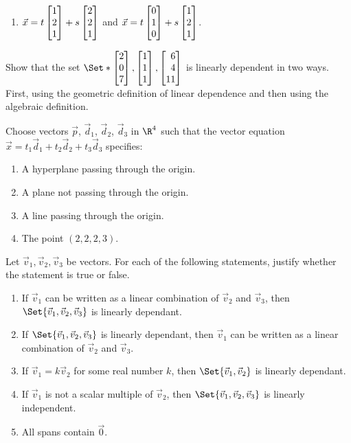\begin{exercises}
\begin{problist}
\begin{enumerate}
			\item $\vec x = t\mat{1\\2\\1}+ s\mat{2\\2\\1}$ and $\vec
				x = t\mat{0\\1\\0}+ s\mat{1\\2\\1}$.
		\end{enumerate}
		
		\prob Show that the set $\Set*{\mat{2\\0\\7},\mat{1\\1\\1},\mat{6\\4\\11}}$
		is linearly dependent in two ways. First, using the geometric definition of linear dependence
		and then using the algebraic definition.

		\prob Choose vectors $\vec p$, $\vec d_{1}$, $\vec d_{2}$,
		$\vec d_{3}$ in $\R^{4}$ such that the vector equation
		$\vec x = t_{1}\vec d_{1} + t_{2}\vec d_{2} + t_{3}\vec d_{3}$ specifies:
		\begin{enumerate}
			\item A hyperplane passing through the origin.

			\item A plane not passing through the origin.

			\item A line passing through the origin.

			\item The point $(2,2,2,3)$.
		\end{enumerate}

		\prob Let $\vec v_{1}, \vec v_{2}, \vec v_{3}$ be vectors. For each of the following statements,
		justify whether the statement is true or false.
		\begin{enumerate}
			\item If $\vec v_{1}$ can be written as a linear combination
				of $\vec v_{2}$ and $\vec v_{3}$, then $\Set{\vec
				v_1,\vec v_2,\vec v_3}$ is linearly dependant.

			\item If $\Set{\vec v_1,\vec v_2,\vec v_3}$ is linearly dependant,
				then $\vec v_{1}$ can be written as a linear combination
				of $\vec v_{2}$ and $\vec v_{3}$.

			\item If $\vec v_{1}=k\vec v_{2}$ for some real number $k$,
				then $\Set{\vec v_1,\vec v_2}$ is linearly dependant.

			\item If $\vec v_{1}$ is not a scalar multiple of $\vec
				v_{2}$, then $\Set{\vec v_1,\vec v_2,\vec v_3}$ is
				linearly independent.

			\item All spans contain $\vec 0$.
		\end{enumerate}
	\end{problist}
\end{exercises}
